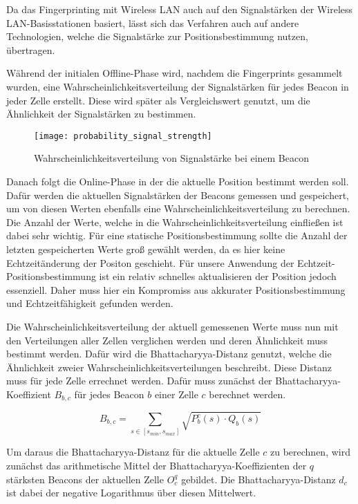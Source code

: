 Da das Fingerprinting mit Wireless LAN auch auf den Signalstärken der Wireless LAN-Basisstationen basiert, lässt sich das Verfahren auch auf andere Technologien, welche die Signalstärke zur Positionsbestimmung nutzen, übertragen.

Während der initialen Offline-Phase wird, nachdem die Fingerprints gesammelt wurden, eine Wahrscheinlichkeitsverteilung der Signalstärken für jedes Beacon in jeder Zelle erstellt. Diese wird später als Vergleichswert genutzt, um die Ähnlichkeit der Signalstärken zu bestimmen.

\begin{figure}[htb!]
		\centering
	\texttt{[image: probability\_signal\_strength]}
	\caption{Wahrscheinlichkeitsverteilung von Signalstärke bei einem Beacon}
	\label{probability-signal-strength-beacon}
\end{figure}

Danach folgt die Online-Phase in der die aktuelle Position bestimmt werden soll. Dafür werden die aktuellen Signalstärken der Beacons gemessen und gespeichert, um von diesen Werten ebenfalls eine Wahrscheinlichkeitsverteilung zu berechnen. Die Anzahl der Werte, welche in die Wahrscheinlichkeitsverteilung einfließen ist dabei sehr wichtig.
Für eine statische Positionsbestimmung sollte die Anzahl der letzten gespeicherten Werte groß gewählt werden, da es hier keine Echtzeitänderung der Positon geschieht.
Für unsere Anwendung der Echtzeit-Positionsbestimmung ist ein relativ schnelles aktualisieren der Position jedoch essenziell. Daher muss hier ein Kompromiss aus akkurater Positionsbestimmung und Echtzeitfähigkeit gefunden werden.

Die Wahrscheinlichkeitsverteilung der aktuell gemessenen Werte muss nun mit den Verteilungen aller Zellen verglichen werden und deren Ähnlichkeit muss bestimmt werden. Dafür wird die Bhattacharyya-Distanz genutzt, welche die Ähnlichkeit zweier Wahrscheinlichkeitsverteilungen beschreibt. 
Diese Distanz muss für jede Zelle errechnet werden. 
Dafür muss zunächst der Bhattacharyya-Koeffizient $B_{b, c}$ für jedes Beacon $b$ einer Zelle $c$ berechnet werden.

\begin{equation}
	B_{b, c} = \sum_{s \in [s_{min},s_{max}]} \sqrt{P_{b}^{c}(s) \cdot Q_{b}(s)}
\end{equation}

Um daraus die Bhattacharyya-Distanz für die aktuelle Zelle $c$ zu berechnen, wird zunächst das arithmetische Mittel der Bhattacharyya-Koeffizienten der $q$ stärksten Beacons der aktuellen Zelle $O_{c}^{q}$ gebildet. Die Bhattacharyya-Distanz $d_{c}$ ist dabei der negative Logarithmus über diesen Mittelwert.


